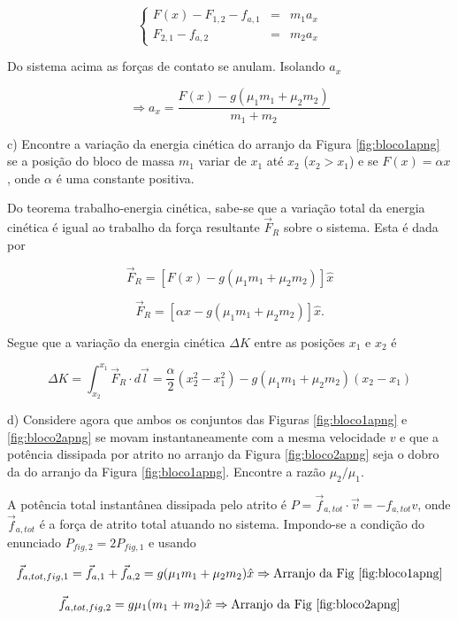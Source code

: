 \begin{enumerate}[start=1,label={\bfseries Q\arabic*.}]
\begin{itemize}
$$
\left\{
\begin{array}{ccc}
	F(x) - F_{1,2} - f_{a,1} & = & m_{1} a_{x} \\
	       F_{2,1} - f_{a,2} & = & m_{2} a_{x}
\end{array}
\right.
$$

Do sistema acima as forças de contato se anulam. Isolando $a_{x}$

$$
\Rightarrow a_{x}  = \frac{F(x) - g(\mu_{1}m_{1} + \mu_{2} m_{2})}{m_{1} + m_{2}}
$$
\end{itemize}

c) Encontre a variação da energia cinética do arranjo da Figura \ref{fig:bloco1apng} se a posição do bloco de massa $m_{1}$ variar de $x_{1}$ até $x_{2}$ ($x_{2} > x_{1}$) e se $F(x) = \alpha x$, onde $\alpha$ é uma constante positiva.

\resposta

Do teorema trabalho-energia cinética, sabe-se que a variação total da energia cinética é igual ao trabalho da força resultante $\vec{F}_{R}$ sobre o sistema. Esta é dada por

$$
\vec{F}_{R} = [F(x) - g(\mu_{1}m_{1} + \mu_{2}m_{2})] \hat{x}
$$

$$
\vec{F}_{R} = [\alpha x - g(\mu_{1}m_{1} + \mu_{2}m_{2})] \hat{x}.
$$

Segue que a variação da energia cinética $\Delta K$ entre as posições $x_{1}$ e $x_{2}$ é

$$
\Delta K = \int_{x_{2}}^{x_{1}} \vec{F}_{R} \cdot d\vec{l} = \frac{\alpha}{2} (x_{2}^{2} - x_{1}^{2}) - g(\mu_{1}m_{1} + \mu_{2}m_{2})(x_{2} - x_{1})
$$

d) Considere agora que ambos os conjuntos das Figuras \ref{fig:bloco1apng} e \ref{fig:bloco2apng} se movam instantaneamente com a mesma velocidade $v$ e que a potência dissipada por atrito no arranjo da Figura \ref{fig:bloco2apng} seja o dobro da do arranjo da Figura \ref{fig:bloco1apng}. Encontre a razão $\mu_{2}/\mu_{1}$.

\resposta

A potência total instantânea dissipada pelo atrito é $P = \vec{f}_{a,tot} \cdot \vec{v} = - f_{a,tot} v$, onde $\vec{f}_{a,tot}$ é a força de atrito total atuando no sistema. Impondo-se a condição do enunciado $P_{fig,2} = 2P_{fig,1}$ e usando

$$
 \vec{f}_{a,tot,fig,1} = \vec{f}_{a,1} + \vec{f}_{a,2} = g(\mu_{1}m_{1} + \mu_{2}m_{2})\hat{x} \Rightarrow \mbox{Arranjo da Fig \ref{fig:bloco1apng}}
$$

$$
 \vec{f}_{a,tot,fig,2} = g\mu_{1}(m_{1} + m_{2}) \hat{x} \Rightarrow \mbox{Arranjo da Fig \ref{fig:bloco2apng}}
$$


\end{enumerate}
